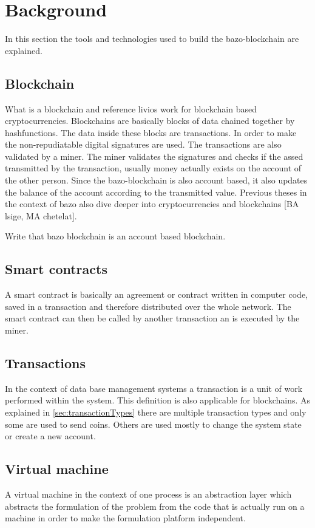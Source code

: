 \section{Background}
In this section the tools and technologies used to build the bazo-blockchain are explained.

\subsection{Blockchain}
What is a blockchain and reference livios work for blockchain based cryptocurrencies. Blockchains are basically blocks of data chained together by hashfunctions. The data inside these blocks are transactions. In order to make the non-repudiatable digital signatures are used. The transactions are also validated by a miner. The miner validates the signatures and checks if the assed transmitted by the transaction, usually money actually exists on the account of the other person. Since the bazo-blockchain is also account based, it also updates the balance of the account according to the transmitted value. Previous theses in the context of bazo also dive deeper into cryptocurrencies and blockchains [BA lsige, MA chetelat].

Write that bazo blockchain is an account based blockchain.

\subsection{Smart contracts}
A smart contract is basically an agreement or contract written in computer code, saved in a transaction and therefore distributed over the whole network. The smart contract can then be called by another transaction an is executed by the miner. 

\subsection{Transactions}
In the context of data base management systems a transaction is a unit of work performed within the system. \cite{dbtransaction} This definition is also applicable for blockchains. As explained in \autoref{sec:transactionTypes}
there are multiple transaction types and only some are used to send coins. Others are used mostly to change the system state or create a new account.

\subsection{Virtual machine}
A virtual machine in the context of one process is an abstraction layer which abstracts the formulation of the problem from the code that is actually run on a machine in order to make the formulation platform independent.

